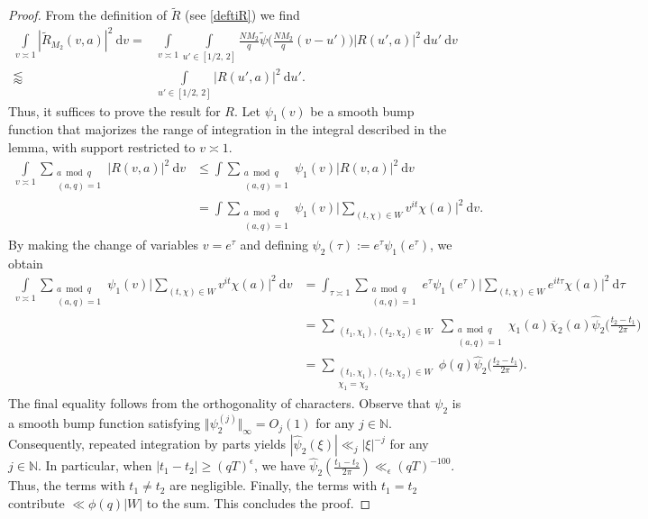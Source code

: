 \documentclass[12pt]{amsart}
\theoremstyle{definition}
\theoremstyle{plain}
\theoremstyle{remark}
\numberwithin{equation}{section}
\numberwithin{theorem}{section}
\numberwithin{equation}{section}
\begin{document}
	\begin{proof}
		From the definition of $\tilde{R}$ (see \eqref{deftiR}) we find
		\begin{align*}
			\int\limits_{v \asymp 1}|\tilde{R}_{M_{2}}(v, a)|^{2}\:\mathrm{d}v
			= &\int\limits_{v \asymp 1}\int\limits_{u' \in [1/2,\, 2]}\frac{NM_{2}}{q}\tilde{\psi}\bigg(\frac{NM_{2}}{q}(v-u')\bigg)| R(u', a)|^{2}
			\:\mathrm{d}u'\:\mathrm{d}v
			\\
			\lessapprox & \int\limits_{ u' \in [1/2,\, 2]}|R(u', a)|^{2}\:\mathrm{d}u'.
		\end{align*}
		Thus, it suffices to prove the result for $R$. 
		Let $\psi_{1}(v)$ be a smooth bump function that  majorizes the range of integration in the integral described in the lemma,  with support restricted to $v \asymp 1$.
		\begin{align*}
			\int\limits_{v \asymp 1}\sum_{\substack{a \bmod q \\ (a,q)=1}}|R(v, a)|^{2}\:\mathrm{d}v 
			&\leq \int\sum_{\substack{a \bmod q \\ (a,q)=1}}\psi_{1}(v)|R(v, a)|^{2}\:\mathrm{d}v  
			\\
			&= \int\sum_{\substack{a \bmod q \\ (a,q)=1}}\psi_{1}(v)\bigg|\sum_{(t, \chi) \in W}v^{it}\chi(a)\bigg|^{2}\:\mathrm{d}v.
		\end{align*}
		By making the change of variables $v=e^{\tau}$ and defining $\psi_{2}(\tau):=e^{\tau}\psi_{1}(e^{\tau})$, we obtain
		\begin{align*}
			\int\limits_{v \asymp 1}\sum_{\substack{a \bmod q \\ (a,q)=1}}\psi_{1}(v)\bigg|\sum_{(t, \chi) \in W}v^{it}\chi(a)\bigg|^{2}\:\mathrm{d}v  
			&= \int_{\tau \asymp 1}\sum_{\substack{a \bmod q \\ (a,q)=1}}e^{\tau}\psi_{1}(e^{\tau})\bigg|\sum_{(t, \chi) \in W}e^{it\tau}\chi(a)\bigg|^{2}\:\mathrm{d}\tau
			\\
			&=\sum_{\substack{(t_1,\chi_1),(t_2, \chi_2)\in W }}\sum_{\substack{a \bmod q \\ (a,q)=1}}\chi_{1}(a)\overline{\chi}_{2}(a)\hat{\psi}_{2}\bigg(\frac{t_{2}-t_{1}}{2\pi}\bigg) \\
			&=\sum_{\substack{(t_1,\chi_1),(t_2,\chi_2)\in W\\ \chi_{1}=\chi_{2}}}\phi(q)\hat{\psi}_{2}\bigg(\frac{t_{2}-t_{1}}{2\pi}\bigg).
		\end{align*}
		The final equality follows from the orthogonality of characters. Observe that $\psi_{2}$ is a smooth bump function satisfying $\Vert \psi_{2}^{(j)} \Vert_{\infty}=O_{j}(1)$ for any $j \in \mathbb{N}$. Consequently, repeated integration by parts yields $|\hat{\psi}_{2}(\xi)| \ll_{j}|\xi|^{-j}$ for any $j \in \mathbb{N}$. In particular, when $|t_{1}-t_{2}| \geq (qT)^{\epsilon}$, we have $\hat{\psi}_{2}(\frac{t_{1}-t_{2}}{2\pi}) \ll_{\epsilon} (qT)^{-100}$. Thus, the terms with $t_{1} \neq t_{2}$ are negligible. Finally, the terms with $t_{1}=t_{2}$ contribute $\ll \phi(q)|W|$ to the sum. This concludes the proof. 
	\end{proof}
	
\end{document}
